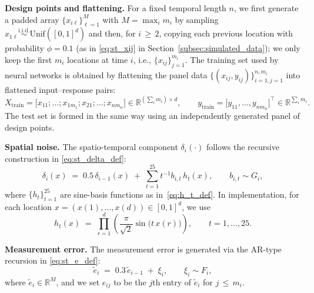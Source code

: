 \documentclass[twoside,11pt]{article}
\newcommand{\rev}[1]{{\color{revisionred}#1}}
\begin{document}
\smallskip
\noindent\textbf{Design points and flattening.}
For a fixed temporal length $n$, we first generate a padded array $\{x_{i\ell}\}_{\ell=1}^M$ with $M=\max_i m_i$ by sampling 
$x_{1\ell}\stackrel{\text{i.i.d.}}{\sim}\mathrm{Unif}([0,1]^d)$ and then, for $i\,\ge\, 2$, copying each previous location with probability $\phi=0.1$ 
(as in \eqref{eq:st_xij} in Section~\ref{subsec:simulated_data}); we only keep the first $m_i$ locations at time $i$, i.e., $\{x_{ij}\}_{j=1}^{m_i}$.
The training set used by neural networks is obtained by flattening the panel data
$\{(x_{ij},y_{ij})\}_{i=1,j=1}^{n,m_i}$ into \rev{flattened input--response pairs}:
\[
X_{\mathrm{train}}=\big[x_{11};\ldots;x_{1m_1};x_{21};\ldots;x_{nm_n}\big]\in\mathbb{R}^{(\sum_i m_i)\times d}, 
\qquad 
y_{\mathrm{train}}=\big[y_{11},\ldots,y_{nm_n}\big]^\top\in\mathbb{R}^{\sum_i m_i}.
\]
The test set is formed in the same way using an independently generated panel of design points.

\smallskip
\noindent\textbf{Spatial noise.}
The spatio-temporal component $\delta_i(\cdot)$ follows the recursive construction in \eqref{eq:st_delta_def}:
\begin{equation}\label{eq:st_delta_nn}
\delta_i(x)\;=\;0.5\,\delta_{i-1}(x)\;+\;\sum_{t=1}^{25} t^{-1} b_{i,t}\, h_t(x),
\qquad b_{i,t}\sim G_i,
\end{equation}
where $\{h_t\}_{t=1}^{25}$ are sine-basis functions as in~\eqref{eq:h_t_def}. 
In implementation, for each location $x=(x(1),\ldots,x(d))\in[0,1]^d$, we use
\begin{equation}\label{eq:st_ht}
h_t(x)\;=\;\prod_{r=1}^d \left(\frac{\pi}{\sqrt{2}}\sin\big(t\,x(r)\big)\right),\qquad t=1,\ldots,25.
\end{equation}

\smallskip
\noindent\textbf{Measurement error.}
The measurement error is generated via the AR-type recursion in \eqref{eq:st_e_def}:
\begin{equation}\label{eq:st_e_nn}
\tilde e_i \;=\; 0.3\,\tilde e_{i-1} \;+\; \xi_i,\qquad \xi_i\sim F_i,
\end{equation}
where $\tilde e_i\in\mathbb{R}^M$, and we set $e_{ij}$ to be the $j$th entry of $\tilde e_i$ for $j\,\le\, m_i$.
\end{document}
